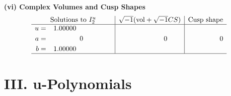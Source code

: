 \documentclass[1p]{elsarticle_modified}
\theoremstyle{definition}
\newcommand{\I}{\sqrt{-1}}
\begin{document}
\newpage\flushleft \textbf{(vi) Complex Volumes and Cusp Shapes}
$$\begin{array}{c|c|c}  
\text{Solutions to }I^u_{2}& \I (\text{vol} + \sqrt{-1}CS) & \text{Cusp shape}\\
 \hline 
\begin{aligned}
u &= \phantom{-}1.00000\phantom{ +0.000000I} \\
a &= \phantom{-0.000000 } 0 \\
b &= \phantom{-}1.00000\phantom{ +0.000000I}\end{aligned}
 & \phantom{-0.000000 } 0 & \phantom{-0.000000 } 0\\
 \hline 
 \end{array}$$\newpage
\newpage\renewcommand{\arraystretch}{1}
\centering \section*{ III. u-Polynomials}
\end{document}
